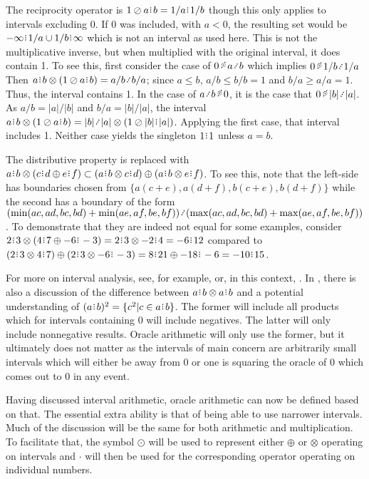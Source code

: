 \documentclass[12pt]{article}
\begin{document}
The reciprocity operator is $1 \oslash a\rint b = 1/a \rint  1/b$ though this only applies to intervals excluding 0. If 0 was included, with $a < 0$, the resulting set would be $-\infty\rint 1/a \cup 1/b \rint  \infty $ which is not an interval as used here. This is not the multiplicative inverse, but when multiplied with the original interval, it does contain 1. To see this, first consider the case of $0 \lt a \lte b$ which implies $0 \lt 1/b \lte 1/a$ Then $a\rint b \otimes (1 \oslash a\rint b) = a/b \lte b/a$; since $a \leq b$, $a /b \leq b/b =1 $ and $b/a \geq a/a = 1$. Thus, the interval contains 1. In the case of $a \lte b \lt 0$, it is the case that $ 0 \lt |b| \lte |a|$. As $a/b = |a|/|b|$ and $b/a = |b|/|a|$, the interval $a\rint b \otimes (1 \oslash a\rint b) = |b| \lte |a| \otimes (1 \oslash |b|\rint |a|)$. Applying the first case, that interval includes 1. Neither case yields the singleton $1\rint 1$ unless $a=b$. 

The distributive property is replaced with $ a\rint b \otimes ( c\rint d \oplus e\rint f) \subset (a\rint b \otimes c\rint d) \oplus (a\rint b \otimes e\rint f)$. To see this, note that the left-side has boundaries chosen from $\{a(c+e), a(d+f), b(c+e), b(d+f)\}$ while the second has a boundary of the form $(\min(ac, ad, bc, bd) + \min(ae, af, be, bf) ) \lte (\max(ac, ad, bc, bd) + \max(ae, af, be, bf) )$. To demonstrate that they are indeed not equal for some examples, consider $2\rint 3 \otimes ( 4\rint 7 \oplus -6\rint -3) = 2\rint 3 \otimes -2\rint 4 = -6\rint 12$ compared to $(2\rint 3 \otimes 4\rint 7) \oplus (2\rint 3 \otimes -6\rint -3) = 8\rint 21 \oplus -18\rint -6 = -10\rint 15$. 

For more on interval analysis, see, for example, \cite{moore} or, in this context, \cite{taylor23main}. In \cite{moore}, there is also a discussion of the difference between $a\rint b \otimes a\rint b$ and a potential understanding of $(a\rint b)^2 = \{c^2 | c \in a\rint b\}$. The former will include all products which for intervals containing 0 will include negatives. The latter will only include nonnegative results. Oracle arithmetic will only use the former, but it ultimately does not matter as the intervals of main concern are arbitrarily small intervals which will either be away from 0 or one is squaring the oracle of 0 which comes out to 0 in any event.  

Having discussed interval arithmetic, oracle arithmetic can now be defined based on that. The essential extra ability is that of being able to use narrower intervals. Much of the discussion will be the same for both arithmetic and multiplication. To facilitate that, the symbol $\odot$ will be used to represent either $\oplus$ or $\otimes$ operating on intervals and $\cdot$ will then be used for the corresponding operator operating on individual numbers.
\end{document}
